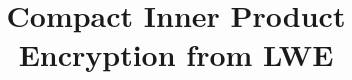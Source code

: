 \documentclass[11pt,hidelinks]{article}
\begin{document}
\title{Compact Inner Product Encryption from LWE}%

\author{}
\date{}
\maketitle







\newpage


\end{document}
